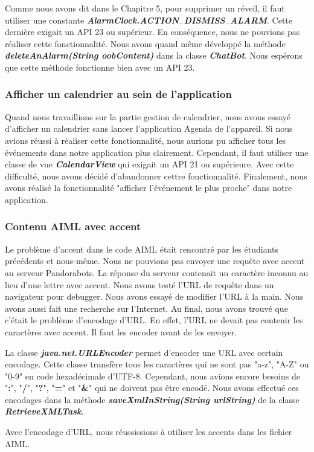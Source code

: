 \indent Comme nous avons dit dans le Chapitre 5, pour supprimer un réveil, il faut utiliser une constante \textbf{\emph{AlarmClock.ACTION$_-$DISMISS$_-$ALARM}}. Cette dernière exigait un API 23 ou supérieur. En conséquence, nous ne pouvions pas réaliser cette fonctionnalité. Nous avons quand même développé la méthode \textbf{\emph{deleteAnAlarm(String oobContent)}} dans la classe \textbf{\emph{ChatBot}}. Nous espérons que cette méthode fonctionne bien avec un API 23.

\subsubsection{Afficher un calendrier au sein de l'application}

\indent Quand nous travaillions sur la partie gestion de calendrier, nous avons essayé d'afficher un calendrier sans lancer l'application Agenda de l'appareil. Si nous avions réussi à réaliser cette fonctionnalité, nous aurions pu afficher tous les événements dans notre application plus clairement. Cependant, il faut utiliser une classe de vue \textbf{\emph{CalendarView}} qui exigait un API 21 ou supérieure. Avec cette difficulté, nous avons décidé d'abandonner cettre fonctionnalité. Finalement, nous avons réalisé la fonctionnalité "afficher l'événement le plus proche" dans notre application. 

\subsubsection{Contenu AIML avec accent}

\indent Le problème d'accent dans le code AIML était rencontré par les étudiants précédents et nous-même. Nous ne pouvions pas envoyer une requête avec accent au serveur Pandorabots. La réponse du serveur contenait un caractère inconnu au lieu d'une lettre avec accent. Nous avons testé l'URL de requête dans un navigateur pour debugger. Nous avons essayé de modifier l'URL à la main. Nous avons aussi fait une recherche sur l'Internet. Au final, nous avons trouvé que c'était le problème d'encodage d'URL. En effet, l'URL ne devait pas contenir les caractères avec accent. Il faut les encoder avant de les envoyer.

\indent La classe \textbf{\emph{java.net.URLEncoder}} permet d'encoder une URL avec certain encodage. Cette classe transfère tous les caractères qui ne sont pas "a-z", "A-Z" ou "0-9" en code hexadécimale d'UTF-8. Cependant, nous avions encore besoins de "\textbf{:}", "\textbf{/}", "\textbf{?}", "\textbf{=}" et "\textbf{\&}" qui ne doivent pas être encodé. Nous avons effectué ces encodages dans la méthode \textbf{\emph{saveXmlInString(String urlString)}} de la classe \textbf{\emph{RetrieveXMLTask}}. 

\indent Avec l'encodage d'URL, nous réussissions à utiliser les accents dans les fichier AIML.

\newpage
